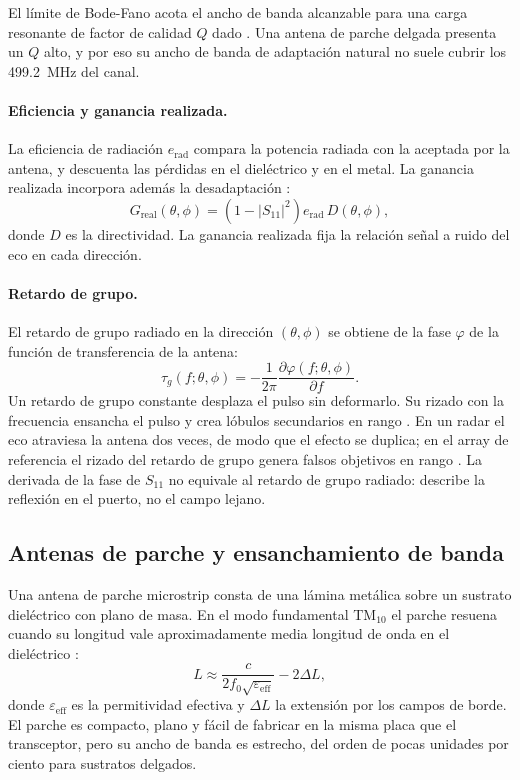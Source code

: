 \documentclass[11pt,a4paper]{article}
\begin{document}
El límite de Bode-Fano acota el ancho de banda alcanzable para una carga resonante de factor de
calidad $Q$ dado \cite{fano1950bode}. Una antena de parche delgada presenta un $Q$ alto, y por eso
su ancho de banda de adaptación natural no suele cubrir los \SI{499.2}{MHz} del canal.

\paragraph{Eficiencia y ganancia realizada.} La eficiencia de radiación $e_\mathrm{rad}$ compara
la potencia radiada con la aceptada por la antena, y descuenta las pérdidas en el dieléctrico y en
el metal. La ganancia realizada incorpora además la desadaptación \cite{balanis2016antenna}:
\begin{equation}
    G_\mathrm{real}(\theta,\phi) = \left(1 - |S_{11}|^2\right) e_\mathrm{rad}\, D(\theta,\phi),
    \label{eq:ganancia_realizada}
\end{equation}
donde $D$ es la directividad. La ganancia realizada fija la relación señal a ruido del eco en cada
dirección.

\paragraph{Retardo de grupo.} El retardo de grupo radiado en la dirección $(\theta,\phi)$ se
obtiene de la fase $\varphi$ de la función de transferencia de la antena:
\begin{equation}
    \tau_g(f;\theta,\phi) = -\frac{1}{2\pi}\frac{\partial \varphi(f;\theta,\phi)}{\partial f}.
    \label{eq:retardo_grupo}
\end{equation}
Un retardo de grupo constante desplaza el pulso sin deformarlo. Su rizado con la frecuencia
ensancha el pulso y crea lóbulos secundarios en rango \cite{wiesbeck2009uwb}. En un radar el eco
atraviesa la antena dos veces, de modo que el efecto se duplica; en el array de referencia el
rizado del retardo de grupo genera falsos objetivos en rango \cite{carretero2027vpa}. La
derivada de la fase de $S_{11}$ no equivale al retardo de grupo radiado: describe la reflexión
en el puerto, no el campo lejano.

\subsection{Antenas de parche y ensanchamiento de banda}\label{sec:parches}
Una antena de parche microstrip consta de una lámina metálica sobre un sustrato dieléctrico con
plano de masa. En el modo fundamental TM$_{10}$ el parche resuena cuando su longitud vale
aproximadamente media longitud de onda en el dieléctrico \cite{balanis2016antenna}:
\begin{equation}
    L \approx \frac{c}{2 f_0 \sqrt{\varepsilon_\mathrm{eff}}} - 2\Delta L,
    \label{eq:longitud_parche}
\end{equation}
donde $\varepsilon_\mathrm{eff}$ es la permitividad efectiva y $\Delta L$ la extensión por los
campos de borde. El parche es compacto, plano y fácil de fabricar en la misma placa que el
transceptor, pero su ancho de banda es estrecho, del orden de pocas unidades por ciento para
sustratos delgados.
\end{document}
